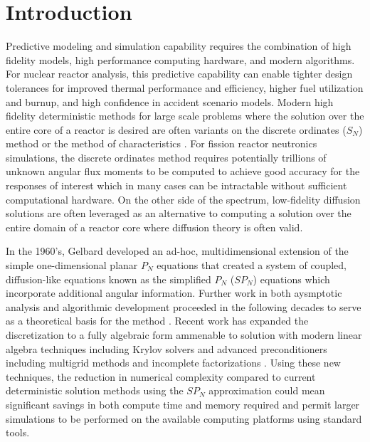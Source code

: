 \documentclass[letterpaper,11pt]{article}
\begin{document}
\section{Introduction}

Predictive modeling and simulation capability requires the combination
of high fidelity models, high performance computing hardware, and
modern algorithms. For nuclear reactor analysis, this predictive
capability can enable tighter design tolerances for improved thermal
performance and efficiency, higher fuel utilization and burnup, and
high confidence in accident scenario models. Modern high fidelity
deterministic methods for large scale problems where the solution over
the entire core of a reactor is desired are often variants on the
discrete ordinates ($S_N$) method \cite{evans_denovo:_2010} or the
method of characteristics \cite{askew_1972}. For fission reactor
neutronics simulations, the discrete ordinates method requires
potentially trillions of unknown angular flux moments to be computed
to achieve good accuracy for the responses of interest
\cite{slaybaugh_acceleration_2011} which in many cases can be
intractable without sufficient computational hardware. On the other
side of the spectrum, low-fidelity diffusion solutions are often
leveraged as an alternative to computing a solution over the entire
domain of a reactor core where diffusion theory is often valid.

In the 1960's, Gelbard developed an ad-hoc, multidimensional extension
of the simple one-dimensional planar $P_N$ equations that created a
system of coupled, diffusion-like equations known as the simplified
$P_N$ ($SP_N$) equations \cite{gelbard_1960} which incorporate
additional angular information. Further work in both aysmptotic
analysis and algorithmic development proceeded in the following
decades to serve as a theoretical basis for the method
\cite{morel_1996,brantley_simplified_2000}. Recent work has expanded
the discretization to a fully algebraic form ammenable to solution
with modern linear algebra techniques including Krylov solvers and
advanced preconditioners including multigrid methods and incomplete
factorizations \cite{hamilton_2014}. Using these new techniques, the
reduction in numerical complexity compared to current deterministic
solution methods using the $SP_N$ approximation could mean significant
savings in both compute time and memory required and permit larger
simulations to be performed on the available computing platforms using
standard tools.
\end{document}
